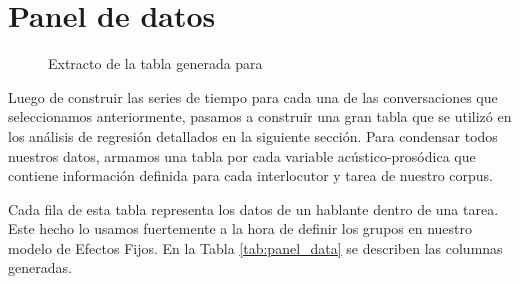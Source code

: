\section{Panel de datos}
\label{sec:panel_data}


\begin{figure}[t!]
\centering

\caption{Extracto de la tabla generada para \FOMEAN}
\label{tab:panel_data_example}
\end{figure}


Luego de construir las series de tiempo para cada una de las conversaciones que seleccionamos anteriormente, pasamos a construir una gran tabla que se utilizó en los análisis de regresión detallados en la siguiente sección. Para condensar todos nuestros datos, armamos una tabla por cada variable acústico-prosódica que contiene información definida para cada interlocutor y tarea de nuestro corpus.

Cada fila de esta tabla representa los datos de un hablante dentro de una tarea. Este hecho lo usamos fuertemente a la hora de definir los grupos en nuestro modelo de Efectos Fijos. En la Tabla \ref{tab:panel_data} se describen las columnas generadas.

